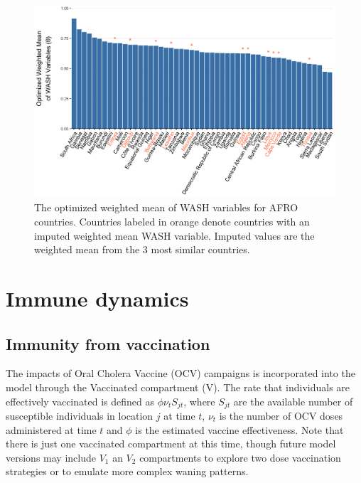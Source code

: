 \documentclass[
]{book}
\begin{document}
\begin{figure}

{\centering \includegraphics[width=1\linewidth]{figures/wash_index_by_country} 

}

\caption{The optimized weighted mean of WASH variables for AFRO countries. Countries labeled in orange denote countries with an imputed weighted mean WASH variable. Imputed values are the weighted mean from the 3 most similar countries.}\label{fig:wash-country}
\end{figure}

\section{Immune dynamics}\label{immune-dynamics}

\subsection{Immunity from vaccination}\label{immunity-from-vaccination}

The impacts of Oral Cholera Vaccine (OCV) campaigns is incorporated into the model through the Vaccinated compartment (V). The rate that individuals are effectively vaccinated is defined as \(\phi\nu_tS_{jt}\), where \(S_{jt}\) are the available number of susceptible individuals in location \(j\) at time \(t\), \(\nu_t\) is the number of OCV doses administered at time \(t\) and \(\phi\) is the estimated vaccine effectiveness. Note that there is just one vaccinated compartment at this time, though future model versions may include \(V_1\) an \(V_2\) compartments to explore two dose vaccination strategies or to emulate more complex waning patterns.
\end{document}

